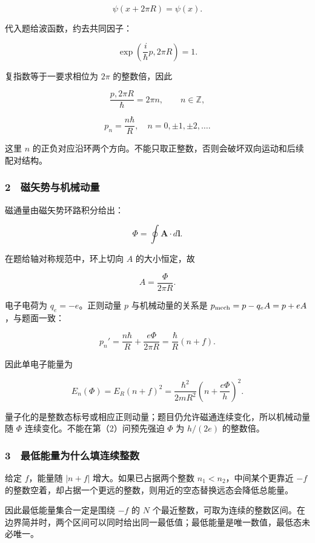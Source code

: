 \documentclass[12pt,a4paper,fontset=fandol]{ctexart}
\begin{document}
\[\psi(x+2\pi R)=\psi(x).\]

代入题给波函数，约去共同因子：

\[\exp\left(\frac{i}{\hbar}p,2\pi R\right)=1.\]

复指数等于一要求相位为 \(2\pi\) 的整数倍，因此

\[\frac{p,2\pi R}{\hbar}=2\pi n,
\qquad n\in\mathbb Z,\]

\[\boxed{p_n=\frac{n\hbar}{R},
\quad n=0,\pm1,\pm2,\ldots.}\]

这里 \(n\)
的正负对应沿环两个方向。不能只取正整数，否则会破坏双向运动和后续配对结构。

\subsubsection{2　磁矢势与机械动量}\label{ux78c1ux77e2ux52bfux4e0eux673aux68b0ux52a8ux91cf}

磁通量由磁矢势环路积分给出：

\[\Phi=\oint\boldsymbol A\cdot d\boldsymbol l.\]

在题给轴对称规范中，环上切向 \(A\) 的大小恒定，故

\[\boxed{A=\frac{\Phi}{2\pi R}.}\]

电子电荷为 \(q_e=-e\)。正则动量 \(p\) 与机械动量的关系是
\(p_{\rm mech}=p-q_eA=p+eA\)，与题面一致：

\[\boxed{p_n'=\frac{n\hbar}{R}
+\frac{e\Phi}{2\pi R}
=\frac\hbar R(n+f).}\]

因此单电子能量为

\[\boxed{E_n(\Phi)=E_R(n+f)^2
=\frac{\hbar^2}{2mR^2}
\left(n+\frac{e\Phi}{h}\right)^2.}\]

量子化的是整数态标号或相应正则动量；题目仍允许磁通连续变化，所以机械动量随
\(\Phi\) 连续变化。不能在第（2）问预先强迫 \(\Phi\) 为 \(h/(2e)\)
的整数倍。

\subsubsection{3　最低能量为什么填连续整数}\label{ux6700ux4f4eux80fdux91cfux4e3aux4ec0ux4e48ux586bux8fdeux7eedux6574ux6570}

给定 \(f\)，能量随 \(|n+f|\) 增大。如果已占据两个整数
\(n_1<n_2\)，中间某个更靠近 \(-f\)
的整数空着，却占据一个更远的整数，则用近的空态替换远态会降低总能量。

因此最低能量集合一定是围绕 \(-f\) 的 \(N\)
个最近整数，可取为连续的整数区间。在边界简并时，两个区间可以同时给出同一最低值；最低能量是唯一数值，最低态未必唯一。
\end{document}
